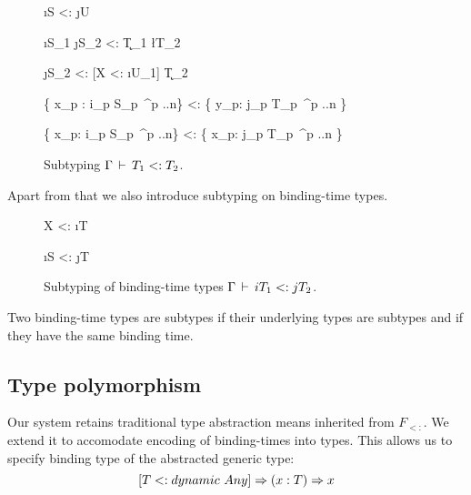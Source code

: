 \begin{figure}[H]


  {\Gamma \ts \i{S} <: \j{U}}

  {\Gamma \ts \i{S_1} \ra \j{S_2} <: \k{T_1} \ra \l{T_2}}

  {\Gamma \ts [X <: \i{U_1}] \ra \j{S_2} <: [X <: \i{U_1}] \ra \k{T_2}}

  {\{ x_p : i_p S_p\ ^{p ..n}\} <: \{ y_p: j_p T_p\ ^{p ..n} \} }

  {\{ x_p: i_p S_p\ ^{p ..n}\} <: \{ x_p: j_p T_p\ ^{p ..n} \}}

\caption{Subtyping $\Gamma \,\vdash\, T_1 <: T_2$.}
\end{figure}

Apart from that we also introduce subtyping on binding-time types.

\begin{figure}[H]
  {\Gamma \ts X <: \i{T}}

  {\Gamma \ts \i{S} <: \j{T}}
\caption{Subtyping of binding-time types $\Gamma \,\vdash\, i T_1 <: j T_2$.}
\end{figure}

Two binding-time types are subtypes if their underlying types are
subtypes and if they have the same binding time.

\subsection{Type polymorphism}

Our system retains traditional type abstraction means inherited from $F_{<:}$.
We extend it to accomodate encoding of binding-times into types. This allows
us to specify binding type of the abstracted generic type:
\begin{equation}\nonumber
  [T <: dynamic\ Any] \Rightarrow (x: T) \Rightarrow x
\end{equation}

